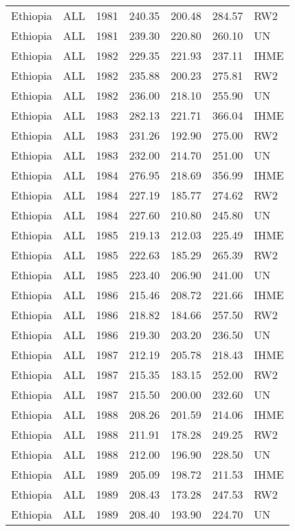 \begin{longtable}{lllrrrl}
  Ethiopia & ALL & 1981 & 240.35 & 200.48 & 284.57 & RW2 \\ 
  Ethiopia & ALL & 1981 & 239.30 & 220.80 & 260.10 & UN \\ 
  Ethiopia & ALL & 1982 & 229.35 & 221.93 & 237.11 & IHME \\ 
  Ethiopia & ALL & 1982 & 235.88 & 200.23 & 275.81 & RW2 \\ 
  Ethiopia & ALL & 1982 & 236.00 & 218.10 & 255.90 & UN \\ 
  Ethiopia & ALL & 1983 & 282.13 & 221.71 & 366.04 & IHME \\ 
  Ethiopia & ALL & 1983 & 231.26 & 192.90 & 275.00 & RW2 \\ 
  Ethiopia & ALL & 1983 & 232.00 & 214.70 & 251.00 & UN \\ 
  Ethiopia & ALL & 1984 & 276.95 & 218.69 & 356.99 & IHME \\ 
  Ethiopia & ALL & 1984 & 227.19 & 185.77 & 274.62 & RW2 \\ 
  Ethiopia & ALL & 1984 & 227.60 & 210.80 & 245.80 & UN \\ 
  Ethiopia & ALL & 1985 & 219.13 & 212.03 & 225.49 & IHME \\ 
  Ethiopia & ALL & 1985 & 222.63 & 185.29 & 265.39 & RW2 \\ 
  Ethiopia & ALL & 1985 & 223.40 & 206.90 & 241.00 & UN \\ 
  Ethiopia & ALL & 1986 & 215.46 & 208.72 & 221.66 & IHME \\ 
  Ethiopia & ALL & 1986 & 218.82 & 184.66 & 257.50 & RW2 \\ 
  Ethiopia & ALL & 1986 & 219.30 & 203.20 & 236.50 & UN \\ 
  Ethiopia & ALL & 1987 & 212.19 & 205.78 & 218.43 & IHME \\ 
  Ethiopia & ALL & 1987 & 215.35 & 183.15 & 252.00 & RW2 \\ 
  Ethiopia & ALL & 1987 & 215.50 & 200.00 & 232.60 & UN \\ 
  Ethiopia & ALL & 1988 & 208.26 & 201.59 & 214.06 & IHME \\ 
  Ethiopia & ALL & 1988 & 211.91 & 178.28 & 249.25 & RW2 \\ 
  Ethiopia & ALL & 1988 & 212.00 & 196.90 & 228.50 & UN \\ 
  Ethiopia & ALL & 1989 & 205.09 & 198.72 & 211.53 & IHME \\ 
  Ethiopia & ALL & 1989 & 208.43 & 173.28 & 247.53 & RW2 \\ 
  Ethiopia & ALL & 1989 & 208.40 & 193.90 & 224.70 & UN \\ 

\end{longtable}
